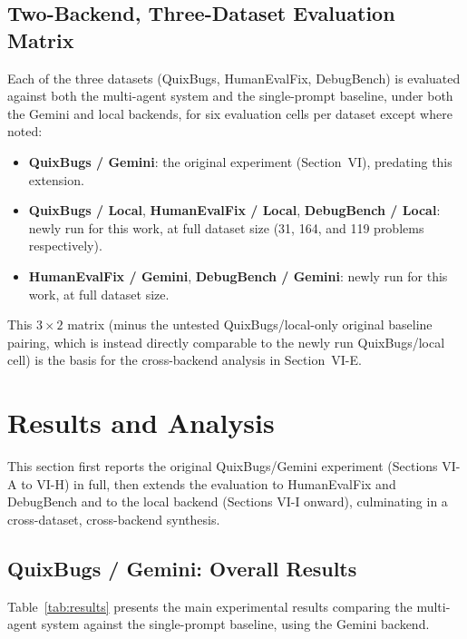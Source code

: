 \documentclass[conference]{IEEEtran}
\begin{document}
\subsection{Two-Backend, Three-Dataset Evaluation Matrix}
Each of the three datasets (QuixBugs, HumanEvalFix, DebugBench) is evaluated against both the multi-agent system and the single-prompt baseline, under both the Gemini and local backends, for six evaluation cells per dataset except where noted:
\begin{itemize}
    \item \textbf{QuixBugs / Gemini}: the original experiment (Section~VI), predating this extension.
    \item \textbf{QuixBugs / Local}, \textbf{HumanEvalFix / Local}, \textbf{DebugBench / Local}: newly run for this work, at full dataset size (31, 164, and 119 problems respectively).
    \item \textbf{HumanEvalFix / Gemini}, \textbf{DebugBench / Gemini}: newly run for this work, at full dataset size.
\end{itemize}
This $3\times2$ matrix (minus the untested QuixBugs/local-only original baseline pairing, which is instead directly comparable to the newly run QuixBugs/local cell) is the basis for the cross-backend analysis in Section~VI-E.

\section{Results and Analysis}
This section first reports the original QuixBugs/Gemini experiment (Sections VI-A to VI-H) in full, then extends the evaluation to HumanEvalFix and DebugBench and to the local backend (Sections VI-I onward), culminating in a cross-dataset, cross-backend synthesis.

\subsection{QuixBugs / Gemini: Overall Results}
Table~\ref{tab:results} presents the main experimental results comparing the multi-agent system against the single-prompt baseline, using the Gemini backend.
\end{document}
